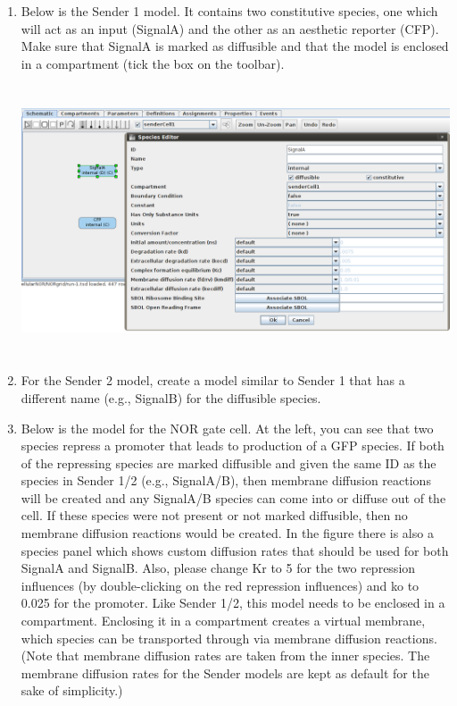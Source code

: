 \documentclass[titlepage,11pt]{article}
\begin{document}
\begin{enumerate}

\item Below is the Sender 1 model.  It contains two constitutive species, one which will act as an input (SignalA) and the other as an aesthetic reporter (CFP).  Make sure that SignalA is marked as diffusible and that the model is enclosed in a compartment (tick the box on the toolbar).

\includegraphics[height=80mm]{screenshots/sender1}

\item For the Sender 2 model, create a model similar to Sender 1 that has a different name (e.g., SignalB) for the diffusible species.

\item Below is the model for the NOR gate cell.  At the left, you can see that two species repress a promoter that leads to production of a GFP species.  If both of the repressing species are marked diffusible and given the same ID as the species in Sender 1/2 (e.g., SignalA/B), then membrane diffusion reactions will be created and any SignalA/B species can come into or diffuse out of the cell.  If these species were not present or not marked diffusible, then no membrane diffusion reactions would be created.  In the figure there is also a species panel which shows custom diffusion rates that should be used for both SignalA and SignalB.  Also, please change Kr to 5 for the two repression influences (by double-clicking on the red repression influences) and ko to 0.025 for the promoter.  Like Sender 1/2, this model needs to be enclosed in a compartment.  Enclosing it in a compartment creates a virtual membrane, which species can be transported through via membrane diffusion reactions.  (Note that membrane diffusion rates are taken from the inner species.  The membrane diffusion rates for the Sender models are kept as default for the sake of simplicity.)


\end{enumerate}
\end{document}
